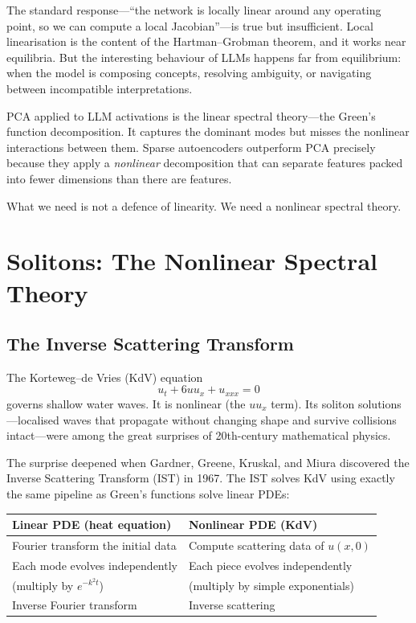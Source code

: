 \documentclass[11pt,a4paper]{article}
\begin{document}
The standard response---``the network is locally linear around any operating
point, so we can compute a local Jacobian''---is true but insufficient. Local
linearisation is the content of the Hartman--Grobman theorem, and it works near
equilibria. But the interesting behaviour of LLMs happens far from equilibrium:
when the model is composing concepts, resolving ambiguity, or navigating between
incompatible interpretations.

PCA applied to LLM activations is the linear spectral theory---the Green's
function decomposition. It captures the dominant modes but misses the
nonlinear interactions between them. Sparse autoencoders outperform PCA
precisely because they apply a \emph{nonlinear} decomposition that can
separate features packed into fewer dimensions than there are features.

What we need is not a defence of linearity. We need a nonlinear spectral theory.

\section{Solitons: The Nonlinear Spectral Theory}

\subsection{The Inverse Scattering Transform}

The Korteweg--de Vries (KdV) equation
\[
  u_t + 6uu_x + u_{xxx} = 0
\]
governs shallow water waves. It is nonlinear (the $uu_x$ term). Its soliton
solutions---localised waves that propagate without changing shape and survive
collisions intact---were among the great surprises of 20th-century mathematical
physics.

The surprise deepened when Gardner, Greene, Kruskal, and Miura discovered
the Inverse Scattering Transform (IST) in 1967. The IST solves KdV using
exactly the same pipeline as Green's functions solve linear PDEs:

\medskip
\begin{center}
\renewcommand{\arraystretch}{1.3}
\begin{tabular}{@{}ll@{}}
\toprule
\textbf{Linear PDE (heat equation)} & \textbf{Nonlinear PDE (KdV)} \\
\midrule
Fourier transform the initial data & Compute scattering data of $u(x,0)$ \\
Each mode evolves independently & Each piece evolves independently \\
(multiply by $e^{-k^2 t}$) & (multiply by simple exponentials) \\
Inverse Fourier transform & Inverse scattering \\
\bottomrule
\end{tabular}
\end{center}
\end{document}
